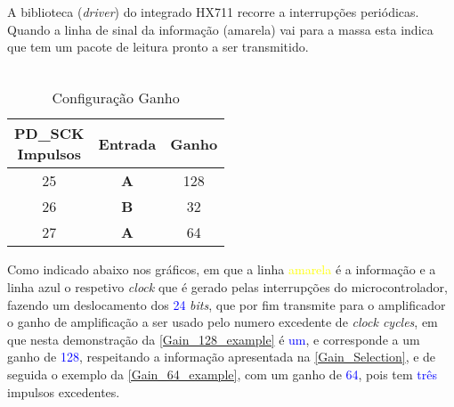A biblioteca (\textit{driver}) do integrado HX711 recorre a interrupções periódicas. Quando a linha de sinal da informação (amarela) vai para a massa esta indica que tem um pacote de leitura pronto a ser transmitido.
\\
\\
\begin{minipage}[!b]{\linewidth}
\begin{minipage}[!b]{.45\linewidth}
	\begin{table}[H]
		\captionsetup{justification=raggedright,singlelinecheck=false}
		\caption{Configuração Ganho}
		\begin{tabular}{ | c | c | c |  }
			\hline
			\makecell[c]{PD\_SCK \\ Impulsos} & Entrada  & Ganho \\
			\hline
			\hline
			25 & \textbf{A} & 128 \\
			\hline
			26 & \textbf{B} & 32 \\
			\hline
			27 & \textbf{A} & 64 \\
			\hline
		\end{tabular}
		\label{Gain_Selection}
	\end{table}
\end{minipage}
\begin{minipage}[l]{.53\linewidth}
\vspace{.1cm}
Como indicado abaixo nos gráficos, em que a linha \textcolor{yellow}{amarela} é a informação e a linha \textcolor{BlueGreen}{azul} o respetivo \textit{clock} que é gerado pelas interrupções do microcontrolador, fazendo um deslocamento dos \textcolor{blue}{24} \textit{bits}, que por fim transmite para o amplificador o ganho de amplificação a ser usado pelo numero excedente de \textit{clock cycles}, em que nesta demonstração da \autoref{Gain_128_example} é \textcolor{blue}{um}, e corresponde a um ganho de \textcolor{blue}{128}, respeitando a informação apresentada na \autoref{Gain_Selection},  e de seguida o exemplo da \autoref{Gain_64_example}, com um ganho de \textcolor{blue}{64}, pois tem \textcolor{blue}{três} impulsos excedentes.
\end{minipage}
\end{minipage}
\\
\\
